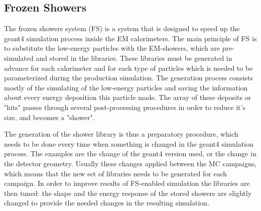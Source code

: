 \subsection{Frozen Showers}
\label{sec:MC_FS}
The frozen showers system (FS) is a system that is designed to speed up the geant4 simulation process inside the EM calorimeters. The main principle of FS is to substitute the low-energy particles with the EM-showers, which are pre-simulated and stored in the libraries. These libraries must be generated in advance for each calorimeter and for each type of particles which is needed to be parameterized during the production simulation. The generation process consists mostly of the simulating of the low-energy particles and saving the information about every energy deposition this particle made. The array of these deposits or "hits" passes through several post-processing procedures in order to reduce it's size, and becomes a "shower".

\begin{figure}[htb]
\end{figure}

The generation of the shower library is thus a preparatory procedure, which needs to be done every time when something is changed in the geant4 simulation process. The examples are the change of the geant4 version used, or the change in the detector geometry. Usually these changes applied between the MC campaigns, which means that the new set of libraries needs to be generated for each campaign. In order to improve results of FS-enabled simulation the libraries are then tuned: the shape and the energy response of the stored showers are slightly changed to provide the needed changes in the resulting simulation.

